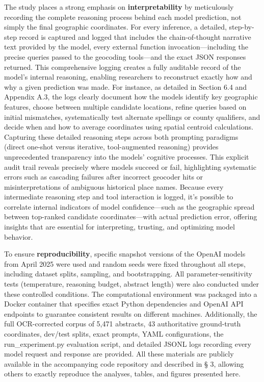 \documentclass[
  10pt,
  twocolumn]{article}
\begin{document}
The study places a strong emphasis on \textbf{interpretability} by
meticulously recording the complete reasoning process behind each model
prediction, not simply the final geographic coordinates. For every
inference, a detailed, step-by-step record is captured and logged that
includes the chain-of-thought narrative text provided by the model,
every external function invocation---including the precise queries
passed to the geocoding tools---and the exact JSON responses returned.
This comprehensive logging creates a fully auditable record of the
model's internal reasoning, enabling researchers to reconstruct exactly
how and why a given prediction was made. For instance, as detailed in
Section 6.4 and Appendix A.3, the logs clearly document how the models
identify key geographic features, choose between multiple candidate
locations, refine queries based on initial mismatches, systematically
test alternate spellings or county qualifiers, and decide when and how
to average coordinates using spatial centroid calculations. Capturing
these detailed reasoning steps across both prompting paradigms (direct
one-shot versus iterative, tool-augmented reasoning) provides
unprecedented transparency into the models' cognitive processes. This
explicit audit trail reveals precisely where models succeed or fail,
highlighting systematic errors such as cascading failures after
incorrect geocoder hits or misinterpretations of ambiguous historical
place names. Because every intermediate reasoning step and tool
interaction is logged, it's possible to correlate internal indicators of
model confidence---such as the geographic spread between top-ranked
candidate coordinates---with actual prediction error, offering insights
that are essential for interpreting, trusting, and optimizing model
behavior.

To ensure \textbf{reproducibility}, specific snapshot versions of the
OpenAI models from April 2025 were used and random seeds were fixed
throughout all steps, including dataset splits, sampling, and
bootstrapping. All parameter-sensitivity tests (temperature, reasoning
budget, abstract length) were also conducted under these controlled
conditions. The computational environment was packaged into a Docker
container that specifies exact Python dependencies and OpenAI API
endpoints to guarantee consistent results on different machines.
Additionally, the full OCR-corrected corpus of 5,471 abstracts, 43
authoritative ground-truth coordinates, dev/test splits, exact prompts,
YAML configurations, the run\_experiment.py evaluation script, and
detailed JSONL logs recording every model request and response are
provided. All these materials are publicly available in the accompanying
code repository and described in § 3, allowing others to exactly
reproduce the analyses, tables, and figures presented here.
\end{document}
